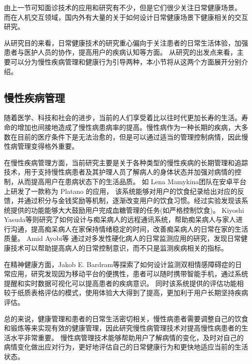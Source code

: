 由上一节可知面诊技术的应用和研究有不少，但是它们很少关注日常健康场景。
而在人机交互领域，国内外有大量的关于如何设计日常健康场景下健康相关的交互研究。

从研究目的来看，日常健康技术的研究重心偏向于关注患者的日常生活体验，加强患者与医护人员的协作，提高用户的疾病认知等方面\cite{nunes2015self-care}。
从研究的出发点来看，主要可以分为慢性疾病管理和健康行为引导两种\cite{nunes2015self-care}，本小节将从这两个方面展开分别介绍。

\subsection{慢性疾病管理}
随着医学、科技和社会的进步，当前的人们享受着比以往时代更加长寿的生活\cite{OlshanskyDEMOGRAPHY}。寿命的增加也间接地造成了慢性病患病率的提高\cite{world2012world}。慢性病作为一种长期的疾病，大多数在目前的医疗条件下是无法治愈的，但是可以通过适当的管理控制病情，因此慢性病管理变得格外重要。

在慢性疾病管理方面，当前研究主要是关于各种类型的慢性疾病的长期管理和追踪技术，用于支持慢性病患者及其护理人员了解病人的身体状态并加强对病情的控制，从而提高用户在患病状态下的生活品质。
如 Lena Mamykina\cite{burgermaster2019personal}团队在安卓平台上研发了一款称为 Platano 的应用，
该系统能够对用户的饮食纪录给出对应的反馈，并通过积分与金钱奖励等机制，逐渐改变用户的饮食习惯。经过实验发现该系统提供的功能能够大大鼓励用户完成血糖管理的任务(如严格控制饮食)。
Kiyoshi Yasuda等\cite{lazar2016evaluation}则研究了如何设计与痴呆病人的远程通讯系统，帮助痴呆病人与家人进行沟通，提高痴呆病人在家保持情绪稳定的时间，改善痴呆病人的日常在家的生活质量。
Amid Ayobi等\cite{ayobi2017quantifying} 通过对多发性硬化病人的日常监测应用的研究，发现日常健康技术可以帮助提高病人的日常控制意识，而不只是监测疾病相关的指标。

在精神健康方面，Jakob E. Bardram等\cite{bardram2013designing}探索了如何设计监测双相情感障碍症的日常应用，研究发现因为移动平台的便携性，患者可以随时携带智能手机，通过系统提醒和实时数据可视化可以提高患者的疾病意识。
同时该系统提供的评估功能相较于纸质表格评估的模式，使用体验大大得到了提高，更加利于用户长期坚持疾病评估。

总的来说，健康管理和患者的日常生活密切相关，慢性病患者需要调整自己的饮食和锻炼等来实现有效的健康管理\cite{nunes2018understanding}，因此研究慢性病管理技术对提高慢性病患者的生活水平非常重要。
慢性病管理技术能够帮助用户了解病情的变化，及时对自己的病情变化做出应对行为，更好地评估自己的日常健康行为和更快地适应当前的生活状态\cite{ayobi2017quantifying}。



